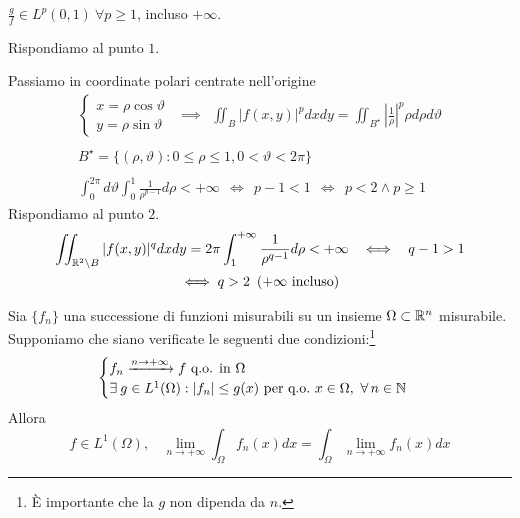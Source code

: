 $\frac{g}{f} \in L^{p}(0, 1) \ \forall p \geq 1$, incluso $ + \infty $.
\Soluzione

Rispondiamo al punto $1$.

Passiamo in coordinate polari centrate nell'origine
\begin{gather*}
\begin{cases}
x = \rho \cos \vartheta \\
y = \rho \sin \vartheta 
\end{cases} \ \ \implies \ \ \iint_{B}| f(x, y)|^{p} dxdy = \iint_{B^{\star}}\left| \frac{1}{\rho}\right|^{p} \rho d\rho d\vartheta \\
\\
B^{\star} = \{(\rho, \vartheta) :0 \leq \rho \leq 1, 0 < \vartheta < 2\pi \}\\
\\
\int^{2\pi}_{0} d\vartheta \int^{1}_{0}\frac{1}{\rho^{p - 1}} d\rho < + \infty \ \ \iff \ \ p - 1 < 1\ \ \iff \ \ p < 2\land p \geq 1
\end{gather*}
Rispondiamo al punto $2$.
\begin{gather*}
\iint_{\mathbb{R}^{2} \setminus B}| f(x, y)|^{q} dxdy = 2\pi \int^{+ \infty}_{1}\frac{1}{\rho^{q - 1}} d\rho < + \infty \ \ \iff \ \ q - 1 > 1\\
\iff q > 2\ \left(+ \infty \ \text{incluso}\right)
\end{gather*}
\Soluzione
\begin{thm}
 Sia $\{f_{n}\}$ una successione di funzioni misurabili su un insieme $\Omega \subset \mathbb{R}^{n}$ misurabile. Supponiamo che siano verificate le seguenti due condizioni:\footnote{È importante che la $g$ non dipenda da $n$.}
\begin{equation*}
\begin{cases}
f_{n}\xrightarrow{n\rightarrow + \infty} f\ \text{q.o. in} \ \Omega \\
\exists g\in L^{1}(\Omega) :| f_{n}| \leq g(x) \ \text{per q.o.} \ x\in \Omega, \ \forall n\in \NN 
\end{cases}
\end{equation*}
Allora
\begin{equation*}
f\in L^{1}(\Omega), \ \ \ \ \lim_{n\rightarrow + \infty}\int_{\Omega} f_{n}(x) dx = \int_{\Omega}\lim_{n\rightarrow + \infty} f_{n}(x) dx
\end{equation*}
\end{thm}
